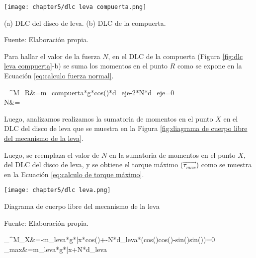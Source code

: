 \begin{itemize}
	\begin{myfigure}[H]
		\footnotesize\centering
		\texttt{[image: chapter5/dlc leva compuerta.png]}
		\caption[Diagrama de cuerpo libre del mecanismo de la compuerta]{(a) DLC del disco de leva. (b) DLC de la compuerta.}
		\begin{myflushcenter}
			Fuente: Elaboración propia.
		\end{myflushcenter}
		\label{fig:dlc leva compuerta}
	\end{myfigure}
	
	Para hallar el valor de la fuerza $N$, en el DLC de la compuerta (Figura \ref{fig:dlc leva compuerta}-b) se suma los momentos en el punto $R$ como se expone en la Ecuación \ref{eq:calculo fuerza normal}.	

	\begin{myequation}\label{eq:calculo fuerza normal}
		\begin{split}
			\sum_{}^{}M_{R}&=m_{compuerta}*g*cos(\beta)*d_{eje}-2*N*d_{eje}=0 \\
			N&=			
		\end{split}		
	\end{myequation}

	Luego, analizamos realizamos la sumatoria de momentos en el punto $X$ en el DLC del disco de leva que se muestra en la Figura \ref{fig:diagrama de cuerpo libre del mecanismo de la leva}.

	Luego, se reemplaza el valor de $N$ en la sumatoria de momentos en el punto $X$, del DLC del disco de leva, y se obtiene el torque máximo ($\overrightarrow{\tau_{max}}$) como se muestra en la Ecuación \ref{eq:calculo de torque máximo}.
	
	\begin{myfigure}[H]
		\footnotesize\centering
		\texttt{[image: chapter5/dlc leva.png]}
		\caption{Diagrama de cuerpo libre del mecanismo de la leva}
		\begin{myflushcenter}
			Fuente: Elaboración propia.
		\end{myflushcenter}
		\label{fig:diagrama de cuerpo libre del mecanismo de la leva}
	\end{myfigure}

	\begin{myequation}\label{eq:calculo de torque máximo}
		\begin{split}
			\sum_{}^{}M_{X}&=-m_{leva}*g*\bar{x}*cos(\alpha)+\tau-N*d_{leva}*(cos(\beta)cos(\theta)-sin(\beta)sin(\theta))=0 \\
			\tau_{max}&=m_{leva}*g*\bar{x}+N*d_{leva} \\
		\end{split}		
	\end{myequation}
	

\end{itemize}

